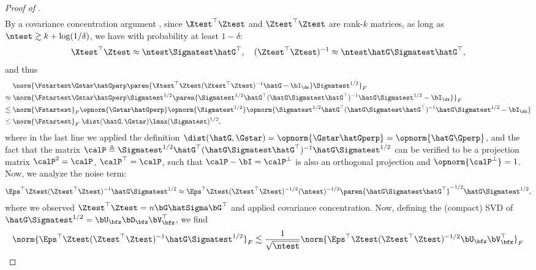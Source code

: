 \begin{proof}[Proof of ]
\begin{align*}
    \end{align*}
    By a covariance concentration argument , since $\Xtest^\top \Ztest$ and $\Ztest^\top \Ztest$ are rank-$k$ matrices, as long as $\ntest \gtrsim k + \log(1/\delta)$, we have with probability at least $1 - \delta$:
    \begin{align*}
        \Xtest^\top \Ztest \approx \ntest \Sigmatest \hatG^\top, \quad (\Ztest^\top \Ztest)^{-1} \approx \ntest \hatG \Sigmatest \hatG^\top,
    \end{align*}
    and thus
    \begin{align*}
        &\norm{\Fstartest \Gstar \hatGperp  \paren{\Xtest^\top \Ztest(\Ztest^\top \Ztest)^{-1}\hatG - \bI_{\dx}} \Sigmatest^{1/2}}_F \\
        \approx\;& \norm{\Fstartest \Gstar \hatGperp  \Sigmatest^{1/2} \paren{ \Sigmatest^{1/2} \hatG^\top (\hatG \Sigmatest \hatG^\top)^{-1}\hatG \Sigmatest^{1/2} - \bI_{\dx} }}_F\\
        \lesssim\;& \norm{\Fstartest}_F \opnorm{\Gstar \hatGperp} \opnorm{\Sigmatest^{1/2}} \opnorm{ \Sigmatest^{1/2} \hatG^\top (\hatG \Sigmatest \hatG^\top)^{-1}\hatG \Sigmatest^{1/2} - \bI_{\dx} }  \\
        \leq\;&\norm{\Fstartest}_F\; \dist(\hatG, \Gstar) \lmax(\Sigmatest)^{1/2},
    \end{align*}
    where in the last line we applied the definition $\dist(\hatG, \Gstar) = \opnorm{\Gstar \hatGperp} = \opnorm{\hatG \Gperp}$, and the fact that the matrix $\calP \triangleq \Sigmatest^{1/2} \hatG^\top (\hatG \Sigmatest \hatG^\top)^{-1}\hatG \Sigmatest^{1/2}$ can be verified to be a projection matrix $\calP^2 = \calP$, $\calP^\top = \calP$, such that $\calP - \bI = \calP^\perp$ is also an orthogonal projection and $\opnorm{\calP^\perp} = 1$. Now, we analyze the noise term:
    \begin{align*}
        \Eps^\top \Ztest (\Ztest^\top \Ztest)^{-1} \hatG \Sigmatest^{1/2} \approx \Eps^\top \Ztest (\Ztest^\top \Ztest)^{-1/2} (\ntest)^{-1/2} \paren{ \hatG \Sigmatest \hatG^\top}^{-1/2} \hatG \Sigmatest^{1/2},
    \end{align*}
    where we observed $\Ztest^\top \Ztest = n \bG \hatSigma \bG^\top$ and applied covariance concentration.
    Now, defining the (compact) SVD of $\hatG \Sigmatest^{1/2} = \bU_\bfz \bD_\bfz \bV_\bfz^\top$, we find
    \begin{align*}
        \norm{\Eps^\top \Ztest (\Ztest^\top \Ztest)^{-1} \hatG \Sigmatest^{1/2}}_F &\lesssim \frac{1}{\sqrt{\ntest}} \norm{\Eps^\top \Ztest (\Ztest^\top \Ztest)^{-1/2} \bU_\bfz \bV_\bfz^\top}_F \\

\end{align*}
\end{proof}
